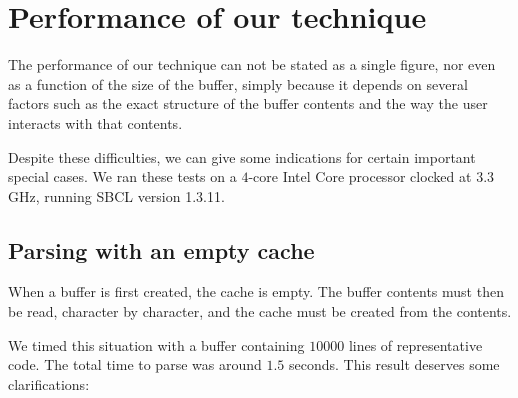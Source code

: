 \section{Performance of our technique}

The performance of our technique can not be stated as a single figure,
nor even as a function of the size of the buffer, simply because it
depends on several factors such as the exact structure of the buffer
contents and the way the user interacts with that contents.

Despite these difficulties, we can give some indications for certain
important special cases.  We ran these tests on a $4$-core Intel Core
processor clocked at $3.3$GHz, running SBCL version 1.3.11.

\subsection{Parsing with an empty cache}

When a buffer is first created, the cache is empty.  The buffer
contents must then be read, character by character, and the cache must
be created from the contents.

We timed this situation with a buffer containing $10000$ lines of
representative \commonlisp{} code.  The total time to parse was around
$1.5$ seconds.  This result deserves some clarifications:

